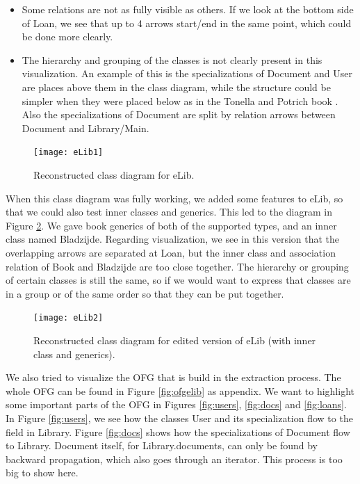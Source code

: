 \documentclass[a4paper,11pt]{article}
\begin{document}
			\begin{itemize}
				\item Some relations are not as fully visible as others. If we look at the bottom side of Loan, we see that up to 4 arrows start/end in the same point, which could be done more clearly.
				\item The hierarchy and grouping of the classes is not clearly present in this visualization. An example of this is the specializations of Document and User are places above them in the class diagram, while the structure could be simpler when they were placed below as in the Tonella and Potrich book \cite{tonella}. Also the specializations of Document are split by relation arrows between Document and Library/Main.
			\end{itemize}
			
			\begin{figure}[h!]
				\centering
				\texttt{[image: eLib1]}
				\caption{Reconstructed class diagram for eLib.}
				\label{fig:elib1}
			\end{figure}
			
			When this class diagram was fully working, we added some features to eLib, so that we could also test inner classes and generics. This led to the diagram in Figure \ref{fig:elib2}. We gave book generics of both of the supported types, and an inner class named Bladzijde. Regarding visualization, we see in this version that the overlapping arrows are separated at Loan, but the inner class and association relation of Book and Bladzijde are too close together. The hierarchy or grouping of certain classes is still the same, so if we would want to express that classes are in a group or of the same order so that they can be put together. \\

			\begin{figure}[h!]
				\centering
				\texttt{[image: eLib2]}
				\caption{Reconstructed class diagram for edited version of eLib (with inner class and generics).}
				\label{fig:elib2}
			\end{figure}

			We also tried to visualize the OFG that is build in the extraction process. The whole OFG can be found in Figure \ref{fig:ofgelib} as appendix. We want to highlight some important parts of the OFG in Figures \ref{fig:users}, \ref{fig:docs} and \ref{fig:loans}. In Figure \ref{fig:users}, we see how the classes User and its specialization flow to the field in Library. Figure \ref{fig:docs} shows how the specializations of Document flow to Library. Document itself, for Library.documents, can only be found by backward propagation, which also goes through an iterator. This process is too big to show here. \\
\end{document}

